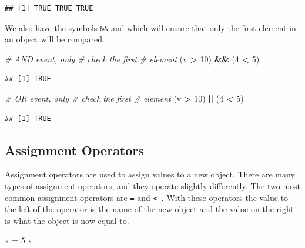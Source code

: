 \documentclass[
]{book}
\newenvironment{Shaded}{\begin{snugshade}}{\end{snugshade}}
\newcommand{\CommentTok}[1]{\textcolor[rgb]{0.56,0.35,0.01}{\textit{#1}}}
\newcommand{\DecValTok}[1]{\textcolor[rgb]{0.00,0.00,0.81}{#1}}
\newcommand{\NormalTok}[1]{#1}
\newcommand{\OperatorTok}[1]{\textcolor[rgb]{0.81,0.36,0.00}{\textbf{#1}}}
\newcommand{\StringTok}[1]{\textcolor[rgb]{0.31,0.60,0.02}{#1}}
\begin{document}
\begin{verbatim}
## [1] TRUE TRUE TRUE
\end{verbatim}

We also have the symbols \texttt{\&\&} and \texttt{\textbar{}\textbar{}} which will ensure that only the first element in an object will be compared.

\begin{Shaded}
\begin{Highlighting}[]
\CommentTok{# AND event, only}
\CommentTok{# check the first}
\CommentTok{# element}
\NormalTok{(v }\OperatorTok{>}\StringTok{ }\DecValTok{10}\NormalTok{) }\OperatorTok{&&}\StringTok{ }\NormalTok{(}\DecValTok{4} \OperatorTok{<}\StringTok{ }\DecValTok{5}\NormalTok{)}
\end{Highlighting}
\end{Shaded}

\begin{verbatim}
## [1] TRUE
\end{verbatim}

\begin{Shaded}
\begin{Highlighting}[]
\CommentTok{# OR event, only}
\CommentTok{# check the first}
\CommentTok{# element}
\NormalTok{(v }\OperatorTok{>}\StringTok{ }\DecValTok{10}\NormalTok{) }\OperatorTok{||}\StringTok{ }\NormalTok{(}\DecValTok{4} \OperatorTok{<}\StringTok{ }\DecValTok{5}\NormalTok{)}
\end{Highlighting}
\end{Shaded}

\begin{verbatim}
## [1] TRUE
\end{verbatim}

\hypertarget{assignment-operators}{%
\subsection*{Assignment Operators}\label{assignment-operators}}

Assignment operators are used to assign values to a new object. There are many types of assignment operators, and they operate slightly differently. The two most common assignment operators are \texttt{=} and \texttt{\textless{}-}. With these operators the value to the left of the operator is the name of the new object and the value on the right is what the object is now equal to.

\begin{Shaded}
\begin{Highlighting}[]
\NormalTok{x =}\StringTok{ }\DecValTok{5}
\NormalTok{x}
\end{Highlighting}
\end{Shaded}
\end{document}
